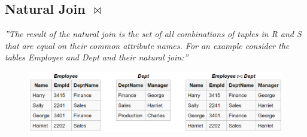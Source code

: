 \subsection{Natural Join $\Join$}

\textit{''The result of the natural join is the set of all combinations of tuples in R and S that are equal on their common attribute names. For an example consider the tables Employee and Dept and their natural join:''}

\begin{figure}[H]
\centering
\includegraphics[width=\linewidth]{figs/spm6/naturaljoin}
\caption{}
\label{fig:naturaljoin}
\end{figure}



